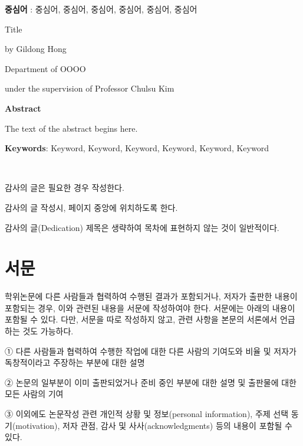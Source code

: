 \documentclass[11pt]{report}
\begin{document}
\textbf{중심어} : 중심어, 중심어, 중심어, 중심어, 중심어, 중심어

\newpage
\begin{center}
\LARGE Title
\par\vspace{20pt}
\doublespacing
\normalsize by Gildong Hong\par
Department of OOOO\par
under the supervision of Professor Chulsu Kim

\par\vspace{20pt}
\LARGE \textbf{Abstract}
\end{center}

\justifying %
\doublespacing
\normalsize
The text of the abstract begins here. 
\par\vspace{1cm}

\textbf{Keywords}: Keyword, Keyword, Keyword, Keyword, Keyword, Keyword

\newpage
~
\vspace{5.5cm} \par
\begin{center}
감사의 글은 필요한 경우 작성한다.\par
감사의 글 작성시, 페이지 중앙에 위치하도록 한다.\par
감사의 글(Dedication) 제목은 생략하여 목차에 표현하지 않는 것이 일반적이다.
\end{center}

\newpage
{}
\chapter*{서문}

\normalsize
학위논문에 다른 사람들과 협력하여 수행된 결과가 포함되거나, 저자가 출판한 내용이 포함되는 경우, 이와 관련된 내용을 서문에 작성하여야 한다. 서문에는 아래의 내용이 포함될 수 있다. 다만, 서문을 따로 작성하지 않고, 관련 사항을 본문의 서론에서 언급하는 것도 가능하다. \par

① 다른 사람들과 협력하여 수행한 작업에 대한 다른 사람의 기여도와 비율 및 저자가 독창적이라고 주장하는 부분에 대한 설명\par
② 논문의 일부분이 이미 출판되었거나 준비 중인 부분에 대한 설명 및 출판물에 대한 모든 사람의 기여\par
③ 이외에도 논문작성 관련 개인적 상황 및 정보(personal information), 주제 선택 동기(motivation), 저자 관점, 감사 및 사사(acknowledgments) 등의 내용이 포함될 수 있다.\par
\end{document}
